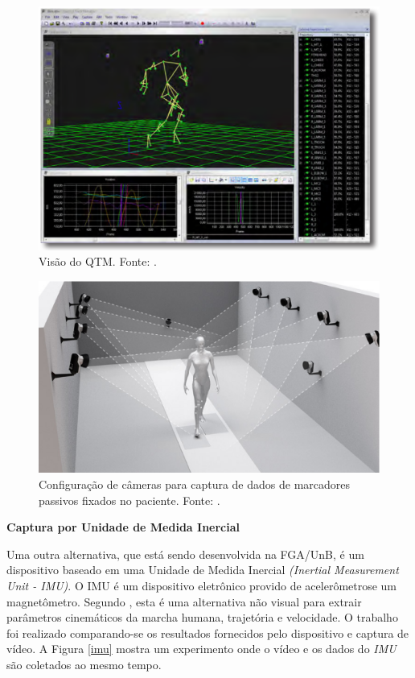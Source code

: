 \begin{figure}[H]
	\centering
	\includegraphics[width=15cm]{figuras/qtm.eps}
	\caption{Visão do QTM. Fonte: \cite{Qualisys2010}.}
	\label{visao_qtm}
	
\end{figure}


\begin{figure}[H]
	\centering
	\includegraphics[width=14cm]{figuras/markers.eps}
	\caption{Configuração de câmeras para captura de dados de marcadores passivos fixados no paciente. Fonte: \cite{Qualisys2013a}.}
	\label{markers}
	
\end{figure}


\textbf{Captura por Unidade de Medida Inercial}

\noindent
Uma outra alternativa, que está sendo desenvolvida na FGA/UnB, é um dispositivo baseado em uma Unidade de Medida Inercial \emph{(Inertial Measurement Unit - IMU)}. O IMU é um dispositivo eletrônico provido de acelerômetrose um magnetômetro.
Segundo , esta é uma alternativa não visual para extrair parâmetros cinemáticos da marcha humana, trajetória e velocidade. 
O trabalho foi realizado comparando-se os resultados fornecidos pelo dispositivo e captura de vídeo.
A Figura \ref{imu} mostra um experimento onde o vídeo e os dados do \emph{IMU} são coletados ao mesmo tempo.


